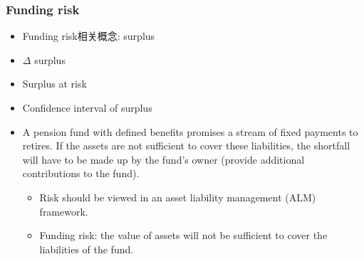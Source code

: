 \subsubsection{Funding risk}
\begin{itemize}
\item Funding risk相关概念: surplus
\item $\Delta$ surplus
\item Surplus at risk
\item Confidence interval of surplus
\item A pension fund with defined benefits promises a stream of fixed payments to retires. If the assets are not sufficient to cover these liabilities, the shortfall will have to be made up by the fund's owner (provide additional contributions to the fund).
    \begin{itemize}
    \item Risk should be viewed in an asset liability management (ALM) framework.
    \item Funding risk: the value of assets will not be sufficient to cover the liabilities of the fund.
    \end{itemize}   
\end{itemize}



